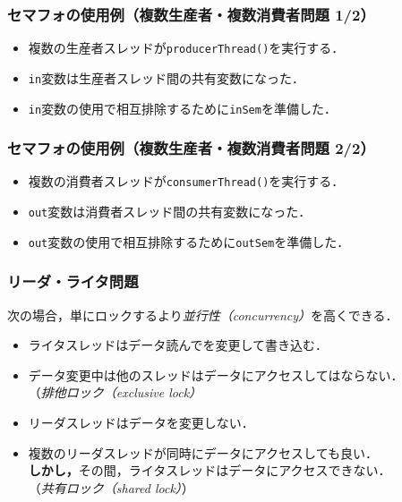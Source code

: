 \documentclass[unicode,handout]{beamer}                   %
\begin{document}
\begin{frame}
  \frametitle{セマフォの使用例（複数生産者・複数消費者問題 1/2）}
  \begin{itemize}
  \item 複数の生産者スレッドが\texttt{producerThread()}を実行する．
  \item \texttt{in}変数は生産者スレッド間の共有変数になった．
  \item \texttt{in}変数の使用で相互排除するために\texttt{inSem}を準備した．
  \end{itemize}
  \vfill
\end{frame}

\begin{frame}
  \frametitle{セマフォの使用例（複数生産者・複数消費者問題 2/2）}
  \begin{itemize}
  \item 複数の消費者スレッドが\texttt{consumerThread()}を実行する．
  \item \texttt{out}変数は消費者スレッド間の共有変数になった．
  \item \texttt{out}変数の使用で相互排除するために\texttt{outSem}を準備した．
  \end{itemize}
  \vfill
\end{frame}

\begin{frame}
  \frametitle{リーダ・ライタ問題}
  次の場合，単にロックするより\emph{並行性（concurrency）}を高くできる．
  \vfill
  \begin{itemize}
  \item ライタスレッドはデータ読んでを変更して書き込む．
  \item データ変更中は他のスレッドはデータにアクセスしてはならない．\\
    （\emph{排他ロック（exclusive lock）}
      \vfill
  \item リーダスレッドはデータを変更しない．
  \item 複数のリーダスレッドが同時にデータにアクセスしても良い．\\
    \textbf{しかし，}その間，ライタスレッドはデータにアクセスできない．\\
    （\emph{共有ロック（shared lock）}）
  \end{itemize}
  \vfill
\end{frame}
\end{document}
